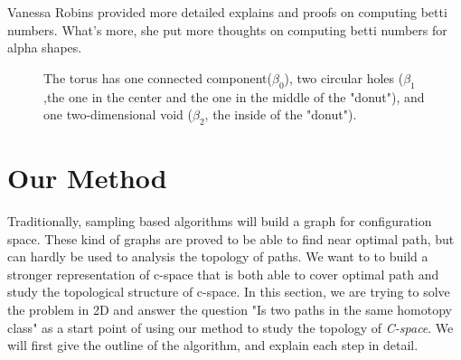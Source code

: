 \documentclass[11pt]{article}
\begin{document}
\indent Vanessa Robins \cite{alpha betti} provided more detailed explains and proofs on computing betti numbers. What's more, she put more thoughts on computing betti numbers for alpha shapes.

\begin{figure}
	\caption{\label{fig:Torus} The torus has one connected component($\beta_0$), two circular holes ($\beta_1$,the one in the center and the one in the middle of the "donut"), and one two-dimensional void ($\beta_2$, the inside of the "donut").\cite{betti wiki}}
\end{figure}


%

\section{Our Method}\label{method}

\indent \indent Traditionally, sampling based algorithms will build a graph for configuration space. These kind of graphs are proved to be able to find near optimal path, but can hardly be used to analysis the topology of paths. We want to to build a stronger representation of c-space that is both able to cover optimal path and study the topological structure of c-space. In this section, we are trying to solve the problem in 2D and answer the question "Is two paths in the same homotopy class" as a start point of using our method to study the topology of \emph{C-space}. We will first give the outline of the algorithm, and explain each step in detail. 
\end{document}
